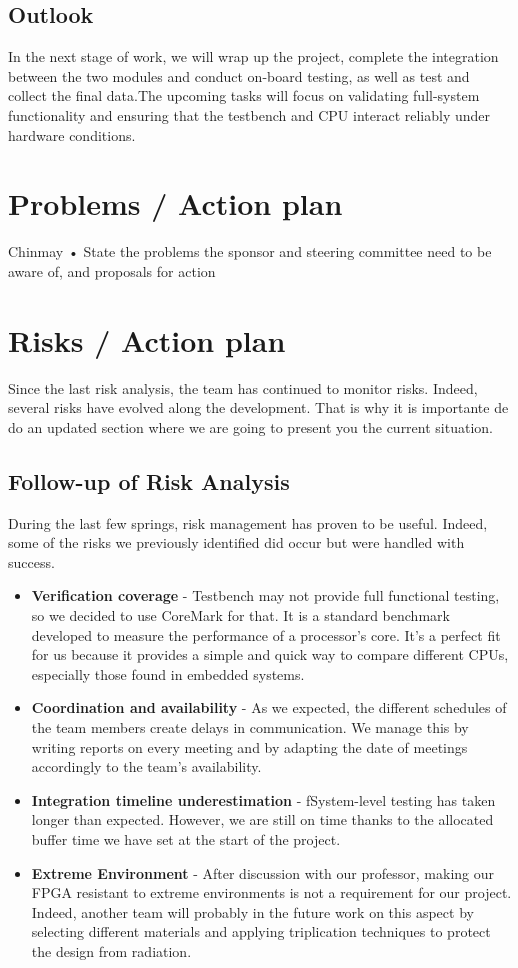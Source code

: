 \documentclass[10pt]{article}
\begin{document}
\subsection{Outlook}
In the next stage of work, we will wrap up the project, complete the integration between the two modules and conduct on-board testing, as well as test and collect the final data.The upcoming tasks will focus on validating full-system functionality and ensuring that the testbench and CPU interact reliably under hardware conditions.



\section{Problems / Action plan}
Chinmay
• State the problems the sponsor and steering committee need to be aware of, and
proposals for action

\newpage
\section{Risks / Action plan}
Since the last risk analysis, the team has continued to monitor risks. Indeed, several risks have evolved along the development. That is why it is importante de do an updated section where we are going to present you the current situation.

\subsection{Follow-up of Risk Analysis}
During the last few springs, risk management has proven to be useful. Indeed, some of the risks we previously identified did occur but were handled with success.
\begin{itemize}
    \item \textbf{Verification coverage} - Testbench may not provide full functional testing, so we decided to use CoreMark for that. It is a standard benchmark developed to measure the performance of a processor's core. It’s a perfect fit for us because it provides a simple and quick way to compare different CPUs, especially those found in embedded systems.
    \item \textbf{Coordination and availability} - As we expected, the different schedules of the team members create delays in communication. We manage this by writing reports on every meeting and by adapting the date of meetings accordingly to the team's availability.
    \item \textbf{Integration timeline underestimation} - fSystem-level testing has taken longer than expected. However, we are still on time thanks to the allocated buffer time we have set at the start of the project.
    \item \textbf{Extreme Environment} - After discussion with our professor, making our FPGA resistant to extreme environments is not a requirement for our project. Indeed, another team will probably in the future work on this aspect by selecting different materials and applying triplication techniques to protect the design from radiation.
\end{itemize}
\end{document}
